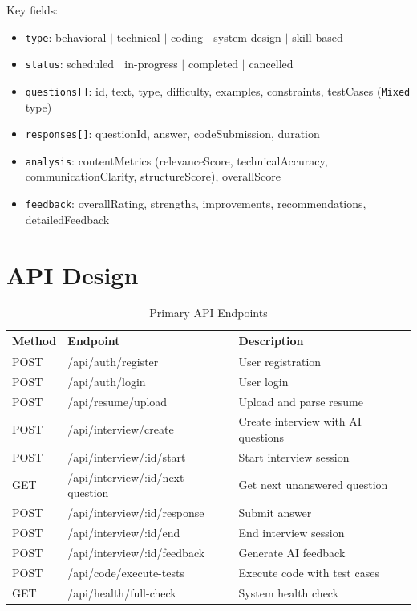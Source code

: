 Key fields:
\begin{itemize}
  \item \texttt{type}: behavioral $|$ technical $|$ coding $|$ system-design $|$ skill-based
  \item \texttt{status}: scheduled $|$ in-progress $|$ completed $|$ cancelled
  \item \texttt{questions[]}: id, text, type, difficulty, examples, constraints, testCases (\texttt{Mixed} type)
  \item \texttt{responses[]}: questionId, answer, codeSubmission, duration
  \item \texttt{analysis}: contentMetrics (relevanceScore, technicalAccuracy, communicationClarity, structureScore), overallScore
  \item \texttt{feedback}: overallRating, strengths, improvements, recommendations, detailedFeedback
\end{itemize}

\section{API Design}

\begin{table}[H]
\centering
\caption{Primary API Endpoints}
\vspace{6pt}
\begin{tabularx}{\textwidth}{|L{1.5cm}|L{5.5cm}|X|}
\hline
\textbf{Method} & \textbf{Endpoint} & \textbf{Description} \\
\hline
POST & /api/auth/register & User registration \\
\hline
POST & /api/auth/login & User login \\
\hline
POST & /api/resume/upload & Upload and parse resume \\
\hline
POST & /api/interview/create & Create interview with AI questions \\
\hline
POST & /api/interview/:id/start & Start interview session \\
\hline
GET  & /api/interview/:id/next-question & Get next unanswered question \\
\hline
POST & /api/interview/:id/response & Submit answer \\
\hline
POST & /api/interview/:id/end & End interview session \\
\hline
POST & /api/interview/:id/feedback & Generate AI feedback \\
\hline
POST & /api/code/execute-tests & Execute code with test cases \\
\hline
GET  & /api/health/full-check & System health check \\
\hline
\end{tabularx}
\label{tab:apiendpoints}
\end{table}

